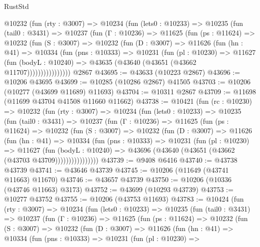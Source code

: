 \begin{lexlean}{RustStd}
\begin{coremodule}
      @10232
        (fun (rty : @3007) =>
        @10234
          (fun (lets0 : @10233) =>
          @10235
            (fun (tail0 : @3431) =>
            @10237
              (fun (Γ : @10236) =>
              @11625
                (fun (ps : @11624) =>
                @10232
                  (fun (S : @3007) =>
                  @10232
                    (fun (D : @3007) =>
                    @11626
                      (fun (hn : @41) =>
                      @10334
                        (fun (pns : @10333) =>
                        @10231
                          (fun (pl : @10230) =>
                          @11627
                            (fun (bodyL : @10240) =>
                            @43635 (@43640 (@43651 (@43662 @11707))))))))))))))))
    @2867
@43695 := @43633 (@10223 @2867)
@43696 := @10206 @43695
@43699 := @10285 (@10286 @2867) @41505
@43703 := @10206 (@10277 (@43699 @11689) @11693)
@43704 := @10311 @2867
@43709 := @11698 (@11699 @43704 @41508 @11660 @11662)
@43738 := @10421
    (fun (rc : @10230) =>
    @10232
      (fun (rty : @3007) =>
      @10234
        (fun (lets0 : @10233) =>
        @10235
          (fun (tail0 : @3431) =>
          @10237
            (fun (Γ : @10236) =>
            @11625
              (fun (ps : @11624) =>
              @10232
                (fun (S : @3007) =>
                @10232
                  (fun (D : @3007) =>
                  @11626
                    (fun (hn : @41) =>
                    @10334
                      (fun (pns : @10333) =>
                      @10231
                        (fun (pl : @10230) =>
                        @11627
                          (fun (bodyL : @10240) =>
                          @43696 (@43640 (@43651 (@43662 (@43703 @43709))))))))))))))))
@43739 := @9408 @6416
@43740 := @43738 @43739
@43741 := @43646 @43739
@43745 := @10206 (@11649 (@43741 @11663) @11670)
@43746 := @43657 @43739
@43750 := @10206 (@10336 (@43746 @11663) @3173)
@43752 := @43699 (@10293 @43739)
@43753 := @10277 @43752
@43755 := @10206 (@43753 @11693)
@43783 := @10424
    (fun (rty : @3007) =>
    @10234
      (fun (lets0 : @10233) =>
      @10235
        (fun (tail0 : @3431) =>
        @10237
          (fun (Γ : @10236) =>
          @11625
            (fun (ps : @11624) =>
            @10232
              (fun (S : @3007) =>
              @10232
                (fun (D : @3007) =>
                @11626
                  (fun (hn : @41) =>
                  @10334
                    (fun (pns : @10333) =>
                    @10231
                      (fun (pl : @10230) =>

\end{coremodule}
\end{lexlean}
